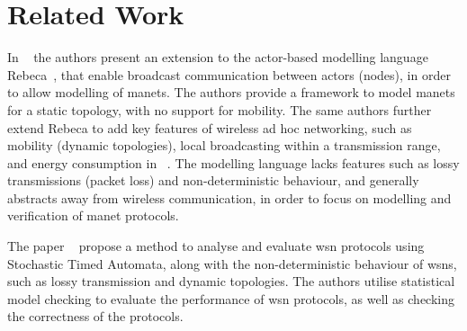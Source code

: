 \section{Related Work}\label{sec:relatedworks}




In ~\cite{DBLP:conf/fsen/YousefiGK15} the authors present an extension to the actor-based modelling language Rebeca~\cite{Sirjani2004ModelingAV}, that enable broadcast communication between actors (nodes), in order to allow modelling of \gls{manet}s. The authors provide a framework to model \gls{manet}s for a static topology, with no support for mobility. The same authors further extend Rebeca to add key features of wireless ad hoc networking, such as mobility (dynamic topologies), local broadcasting within a transmission range, and energy consumption in ~\cite{DBLP:journals/fac/YousefiGK17}. The modelling language lacks features such as lossy transmissions (packet loss) and non-deterministic behaviour, and generally abstracts away from wireless communication, in order to focus on modelling and verification of \gls{manet} protocols.\smallbreak

The paper ~\cite{article:maeofwsnpbsta} propose a method to analyse and evaluate \gls{wsn} protocols using Stochastic Timed Automata, along with the non-deterministic behaviour of \gls{wsn}s, such as lossy transmission and dynamic topologies. The authors utilise statistical model checking to evaluate the performance of \gls{wsn} protocols, as well as checking the correctness of the protocols.\smallbreak


